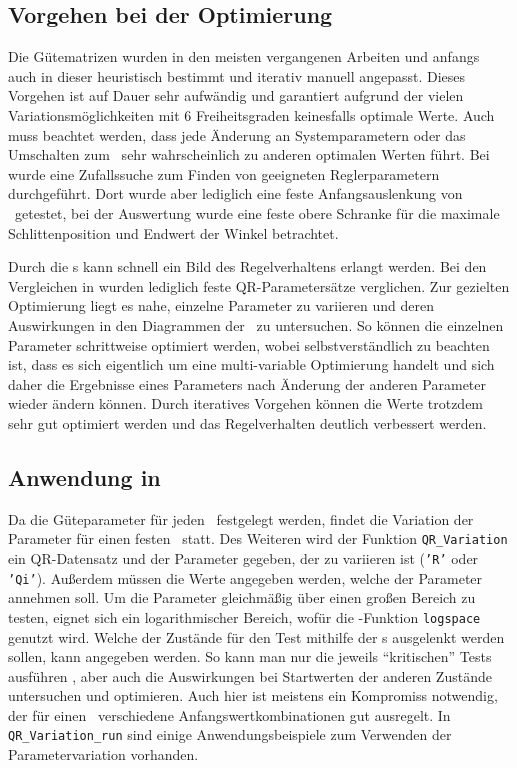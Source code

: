 \subsection{Vorgehen bei der Optimierung}

Die Gütematrizen wurden in den meisten vergangenen Arbeiten und anfangs auch in dieser heuristisch bestimmt und iterativ manuell angepasst.
Dieses Vorgehen ist auf Dauer sehr aufwändig und garantiert aufgrund der vielen Variationsmöglichkeiten mit 6 Freiheitsgraden keinesfalls optimale Werte.
Auch muss beachtet werden, dass jede Änderung an Systemparametern oder das Umschalten zum \beob\ sehr wahrscheinlich zu anderen optimalen Werten führt.
Bei \cite{chang} wurde eine Zufallssuche zum Finden von geeigneten Reglerparametern durchgeführt.
Dort wurde aber lediglich eine feste Anfangsauslenkung von \phz\ getestet, bei der Auswertung wurde eine feste obere Schranke für die maximale Schlittenposition und Endwert der Winkel betrachtet.

Durch die \xots s  kann schnell ein Bild des Regelverhaltens erlangt werden.
Bei den Vergleichen in  wurden lediglich feste QR-Parametersätze verglichen.
Zur gezielten Optimierung liegt es nahe, einzelne Parameter zu variieren und deren Auswirkungen in den Diagrammen der \xots\ zu untersuchen.
So können die einzelnen Parameter schrittweise optimiert werden, wobei selbstverständlich zu beachten ist, dass es sich eigentlich um eine multi-variable Optimierung handelt und sich daher die Ergebnisse eines Parameters nach Änderung der anderen Parameter wieder ändern können.
Durch iteratives Vorgehen können die Werte trotzdem sehr gut optimiert werden und das Regelverhalten deutlich verbessert werden.


\subsection{Anwendung in \ml}

Da die Güteparameter für jeden \ap\ festgelegt werden, findet die Variation der Parameter für einen festen \ap\ statt.
Des Weiteren wird der Funktion \texttt{QR\_Variation} ein QR-Datensatz und der Parameter gegeben, der zu variieren ist (\texttt{'R'} oder \texttt{'Qi'}).
Außerdem müssen die Werte angegeben werden, welche der Parameter annehmen soll.
Um die Parameter gleichmäßig über einen großen Bereich zu testen, eignet sich ein logarithmischer Bereich, wofür die \ml-Funktion \texttt{logspace} genutzt wird.
Welche der Zustände für den Test mithilfe der \xots s ausgelenkt werden sollen, kann angegeben werden.
So kann man nur die jeweils "`kritischen"' Tests ausführen , aber auch die Auswirkungen bei Startwerten der anderen Zustände untersuchen und optimieren.
Auch hier ist meistens ein Kompromiss notwendig, der für einen \ap\ verschiedene Anfangswertkombinationen gut ausregelt.
In \texttt{QR\_Variation\_run} sind einige Anwendungsbeispiele zum Verwenden der Parametervariation vorhanden.


